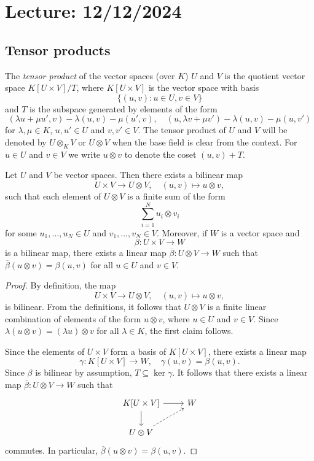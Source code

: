 \section{Lecture: 12/12/2024}
\label{11}

\subsection{Tensor products}

The \emph{tensor product} of the vector spaces (over $K$) $U$ and $V$ 
is the quotient vector space $K[U\times V]/T$, where $K[U\times V]$ 
is the vector space with basis 
\[
\{(u,v):u\in U,v\in V\}
\]
and $T$ is the subspace 
generated by elements of the form 
\[
		(\lambda u+\mu u',v)-\lambda(u,v)-\mu(u',v),\quad
		(u,\lambda v+\mu v')-\lambda(u,v)-\mu(u,v')
	\]
for $\lambda,\mu\in K$, $u,u'\in U$ and $v,v'\in V$.
The tensor product of $U$ and $V$ will be denoted by $U\otimes_KV$ or 
$U\otimes V$ when the base field is clear from the context. For $u\in U$ and 
$v\in V$ we write $u\otimes v$ to denote the coset $(u,v)+T$.

\begin{theorem}
	Let $U$ and $V$ be vector spaces. Then there exists a bilinear map 
	\[
    U\times V\to U\otimes V,\quad (u,v)\mapsto u\otimes v,
    \]
    such that 
	each element of $U\otimes V$ is a finite sum of the form 
	\[
		\sum_{i=1}^N u_i\otimes v_i
	\]
	for some $u_1,\dots,u_N\in U$ and $v_1,\dots,v_N\in V$. 
	Moreover, if $W$ is a vector space and 
 \[
 \beta\colon U\times V\to W
 \]
 is a bilinear map, 
	there exists a linear map 
	$\overline{\beta}\colon U\otimes V\to W$ such that $\overline{\beta}(u\otimes
	v)=\beta(u,v)$ for all $u\in U$ and $v\in V$.
\end{theorem}

\begin{proof}
    By definition, the map
    \[
	U\times V\to U\otimes V,\quad
	(u,v)\mapsto u\otimes v,
	\]
	is bilinear. From the definitions, it follows that
	$U\otimes V$ is a finite linear combination of elements of the form 
	$u\otimes v$, where $u\in U$ and $v\in V$. Since $\lambda(u\otimes
	v)=(\lambda u)\otimes v$ for all $\lambda\in K$, the first claim follows.

	Since the elements of $U\times V$ form a basis of $K[U\times V]$, there exists
	a linear map 
	\[
		\gamma\colon K[U\times V]\to W,\quad
	\gamma(u,v)=\beta(u,v). 
	\]
	Since $\beta$ is bilinear by assumption, $T\subseteq\ker\gamma$. It follows that there exists 
	a linear map $\overline{\beta}\colon U\otimes V\to
	W$ such that  
	\[
	\begin{tikzcd}
		K[U\times V] \arrow[r]\arrow[d] & W \\
		U\otimes V\arrow[ur, dashrightarrow]
	\end{tikzcd}
	\]
	commutes. In particular, $\overline{\beta}(u\otimes v)=\beta(u,v)$. 
\end{proof}

